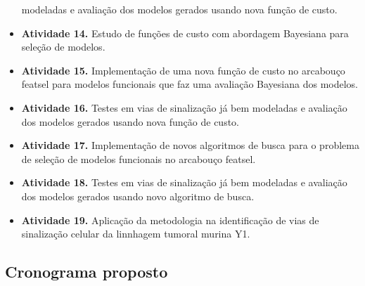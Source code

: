 \documentclass[12pt]{article}
\begin{document}
\begin{itemize}
        modeladas e avaliação dos modelos gerados usando nova função de
        custo.
    \item{\bf Atividade 14.} Estudo de funções de custo com abordagem
        Bayesiana para seleção de modelos.
    \item{\bf Atividade 15.} Implementação de uma nova função de custo 
        no arcabouço featsel para modelos funcionais que faz uma 
        avaliação Bayesiana dos modelos.
    \item{\bf Atividade 16.} Testes em vias de sinalização já bem
        modeladas e avaliação dos modelos gerados usando nova função de
        custo.
    \item{\bf Atividade 17.} Implementação de novos algoritmos de busca
        para o problema de seleção de modelos funcionais no arcabouço
        featsel.
    \item{\bf Atividade 18.} Testes em vias de sinalização já bem
        modeladas e avaliação dos modelos gerados usando novo algoritmo
        de busca.
    \item{\bf Atividade 19.} Aplicação da metodologia na identificação de vias de sinalização celular da linnhagem tumoral murina Y1.

\end{itemize}
\subsection{Cronograma proposto}
\end{document}
